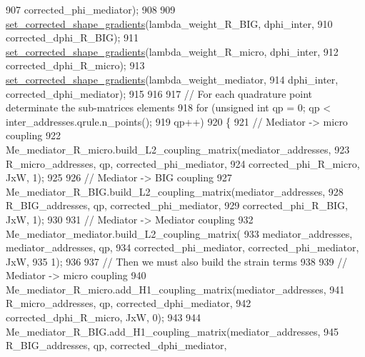 \begin{DoxyCode}
907                     corrected\_phi\_mediator);
908 
909                 \hyperlink{classcarl_1_1assemble__coupling__matrices_a7f5ae4da1fe905fb90e9016f1dbb2fea}{set\_corrected\_shape\_gradients}(lambda\_weight\_R\_BIG, dphi\_inter,
910                         corrected\_dphi\_R\_BIG);
911                 \hyperlink{classcarl_1_1assemble__coupling__matrices_a7f5ae4da1fe905fb90e9016f1dbb2fea}{set\_corrected\_shape\_gradients}(lambda\_weight\_R\_micro, 
      dphi\_inter,
912                         corrected\_dphi\_R\_micro);
913                 \hyperlink{classcarl_1_1assemble__coupling__matrices_a7f5ae4da1fe905fb90e9016f1dbb2fea}{set\_corrected\_shape\_gradients}(lambda\_weight\_mediator,
914                         dphi\_inter, corrected\_dphi\_mediator);
915 
916 
917             \textcolor{comment}{// For each quadrature point determinate the sub-matrices elements}
918             \textcolor{keywordflow}{for} (\textcolor{keywordtype}{unsigned} \textcolor{keywordtype}{int} qp = 0; qp < inter\_addresses.qrule.n\_points();
919                     qp++)
920             \{
921                 \textcolor{comment}{// Mediator -> micro coupling}
922                 Me\_mediator\_R\_micro.build\_L2\_coupling\_matrix(mediator\_addresses,
923                         R\_micro\_addresses, qp, corrected\_phi\_mediator,
924                         corrected\_phi\_R\_micro, JxW, 1);
925 
926                 \textcolor{comment}{// Mediator -> BIG coupling}
927                 Me\_mediator\_R\_BIG.build\_L2\_coupling\_matrix(mediator\_addresses,
928                         R\_BIG\_addresses, qp, corrected\_phi\_mediator,
929                         corrected\_phi\_R\_BIG, JxW, 1);
930 
931                 \textcolor{comment}{// Mediator -> Mediator coupling}
932                 Me\_mediator\_mediator.build\_L2\_coupling\_matrix(
933                         mediator\_addresses, mediator\_addresses, qp,
934                         corrected\_phi\_mediator, corrected\_phi\_mediator, JxW,
935                         1);
936 
937                     \textcolor{comment}{// Then we must also build the strain terms}
938 
939                     \textcolor{comment}{// Mediator -> micro coupling}
940                     Me\_mediator\_R\_micro.add\_H1\_coupling\_matrix(mediator\_addresses,
941                             R\_micro\_addresses, qp, corrected\_dphi\_mediator,
942                             corrected\_dphi\_R\_micro, JxW, 0);
943 
944                     Me\_mediator\_R\_BIG.add\_H1\_coupling\_matrix(mediator\_addresses,
945                             R\_BIG\_addresses, qp, corrected\_dphi\_mediator,

\end{DoxyCode}
